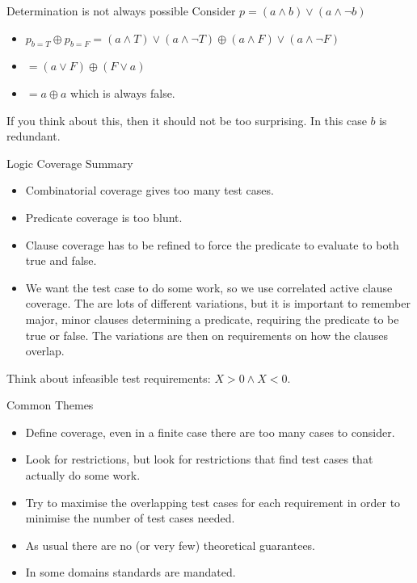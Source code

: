 \documentclass{beamer}
\begin{document}
\begin{frame}{Determination is not always possible}
  Consider $p = (a\land b) \lor  (a\land \neg b)$ 
  \begin{itemize}
  \item $p_{b=T} \oplus p_{b=F} = (a\land T) \lor (a\land \neg T) \oplus
    (a\land F) \lor (a\land \neg F)$
  \item $=(a \lor F) \oplus (F \lor a)$
  \item $=a \oplus a$ which is always false. 
  \end{itemize}
If you think about this, then it should not be too surprising.  In
this case $b$ is redundant.
\end{frame}
\begin{frame}{Logic Coverage Summary}
  \begin{itemize}
  \item Combinatorial coverage gives too many test cases.
  \item Predicate coverage is too blunt.
  \item Clause coverage has to be refined to force the predicate to
    evaluate to both true and false.
  \item We want the test case to do some work, so we use correlated
    active clause coverage. The are lots of different variations, but
    it is important to remember major, minor clauses determining a
    predicate, requiring the predicate to be true or false. The
    variations are then on requirements on how the clauses overlap.
  \end{itemize}
  Think about infeasible   test requirements: $X>0 \land X<0$.
\end{frame}
\begin{frame}{Common Themes}
  \begin{itemize}
  \item Define coverage, even in a finite case there are too many
    cases to consider.
  \item Look for restrictions, but look for restrictions that find
    test cases that actually do some work.
  \item Try to maximise the overlapping test cases for each
    requirement in order to minimise the number of test cases needed.
  \item As usual there are no (or very few) theoretical guarantees.
  \item In some domains standards are mandated. 
  \end{itemize}
\end{frame}
\end{document}
